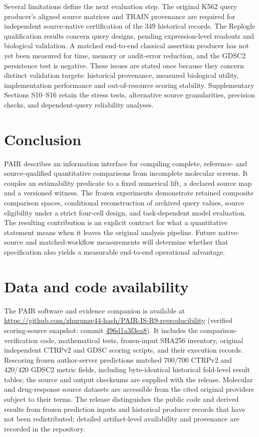\documentclass[preprint,11pt,times,number,sort&compress]{elsarticle}
\begin{document}
Several limitations define the next evaluation step. The original K562 query producer's aligned source matrices and TRAIN provenance are required for independent source-native certification of the 349 historical records. The Replogle qualification results concern query designs, pending expression-level readouts and biological validation. A matched end-to-end classical assertion producer has not yet been measured for time, memory or audit-error reduction, and the GDSC2 persistence test is negative. These issues are stated once because they concern distinct validation targets: historical provenance, measured biological utility, implementation performance and out-of-resource scoring stability. Supplementary Sections S10--S16 retain the stress tests, alternative source granularities, precision checks, and dependent-query reliability analyses.

\section{Conclusion}
PAIR describes an information interface for compiling complete, reference- and source-qualified quantitative comparisons from incomplete molecular screens. It couples an estimability predicate to a fixed numerical lift, a declared source map and a versioned witness. The frozen experiments demonstrate retained composite comparison spaces, conditional reconstruction of archived query values, source eligibility under a strict four-cell design, and task-dependent model evaluation. The resulting contribution is an explicit contract for what a quantitative statement means when it leaves the original analysis pipeline. Future native-source and matched-workflow measurements will determine whether that specification also yields a measurable end-to-end operational advantage.

\section*{Data and code availability}
The PAIR software and evidence companion is available at \url{https://github.com/zhurunze44-hash/PAIR-IS-R9-reproducibility} (verified scoring-source snapshot: commit \href{https://github.com/zhurunze44-hash/PAIR-IS-R9-reproducibility/commit/496d1a3f3ea80009033891811ffa11ed9f7cf334}{496d1a3f3ea8}). It includes the comparison-verification code, mathematical tests, frozen-input SHA256 inventory, original independent CTRPv2 and GDSC scoring scripts, and their execution records. Rescoring frozen author-server predictions matched 700/700 CTRPv2 and 420/420 GDSC2 metric fields, including byte-identical historical fold-level result tables; the source and output checksums are supplied with the release. Molecular and drug-response source datasets are accessible from the cited original providers subject to their terms. The release distinguishes the public code and derived results from frozen prediction inputs and historical producer records that have not been redistributed; detailed artifact-level availability and provenance are recorded in the repository.
\end{document}
